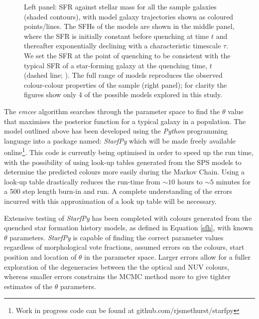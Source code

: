 \documentclass{mn2e}
\begin{document}

\begin{figure}
\caption{Left panel: SFR against stellar mass for all the sample galaxies (shaded contours), with model galaxy trajectories shown as coloured points/lines. The SFHs of the models are shown in the middle panel, where the SFR is initially constant before quenching at time $t$ and thereafter exponentially declining with a characteristic timescale $\tau$. We set the SFR at the point of quenching to be consistent with the typical SFR of a star-forming galaxy at the quenching time, $t$ (dashed line; \citealt{Peng}). The full range of models reproduces the observed colour-colour properties of the sample (right panel); for clarity the figures show only 4 of the possible models explored in this study.}
\label{sfr_mass_col}
\end{figure}

The \emph{emcee} algorithm searches through the parameter space to find the $\theta$ value that maximises the posterior function for a typical galaxy in a population. The model outlined above has been developed using the \emph{Python} programming language into a package named: \emph{StarfPy} which will be made freely available online\footnote{Work in progress code can be found at github.com/rjsmethurst/starfpy}. This code is currently being optimised in order to speed up the run time, with the possibility of using look-up tables generated from the SPS models to determine the predicted colours more easily during the Markov Chain. Using a look-up table drastically reduces the run-time from $\sim 10$ hours to $\sim 5$ minutes for a 500 step length burn-in and run. A complete understanding of the errors incurred with this approximation of a look up table will be necessary. 

Extensive testing of \emph{StarfPy} has been completed with colours generated from the quenched star formation history models, as defined in Equation \ref{sfh}, with known $\theta$ parameters. \emph{StarfPy} is capable of finding the correct parameter values regardless of morphological vote fractions, assumed errors on the colours, start position and location of $\theta$ in the parameter space. Larger errors allow for a fuller exploration of the degeneracies between the the optical and NUV colours, whereas smaller errors constrains the MCMC method more to give tighter estimates of the $\theta$ parameters. 
\end{document}
